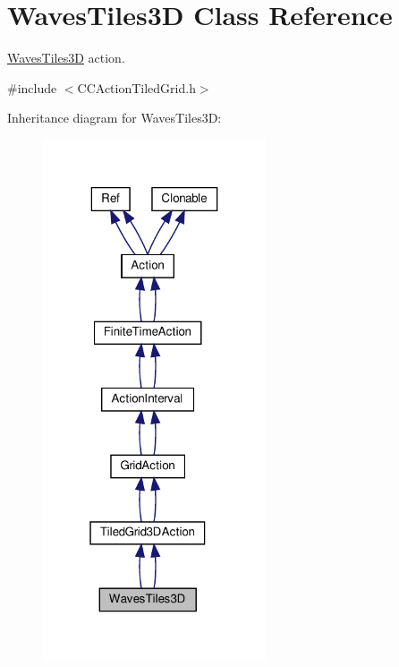 \hypertarget{classWavesTiles3D}{}\section{Waves\+Tiles3D Class Reference}
\label{classWavesTiles3D}


\hyperlink{classWavesTiles3D}{Waves\+Tiles3D} action.  




{\ttfamily \#include $<$C\+C\+Action\+Tiled\+Grid.\+h$>$}



Inheritance diagram for Waves\+Tiles3D\+:
\nopagebreak
\begin{figure}[H]
\begin{center}
\leavevmode
\includegraphics[width=187pt]{classWavesTiles3D__inherit__graph}
\end{center}
\end{figure}


